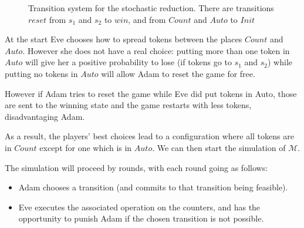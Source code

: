 \documentclass{article}
\begin{document}
	\begin{figure}[h]
		\caption{Transition system for the stochastic reduction. There are transitions $reset$ from $s_1$ and $s_2$ to $win$, and from $Count$ and $Auto$ to $Init$}
		\label{fig-sreach1}
	\end{figure}
	
	At the start Eve chooses how to spread tokens between the places $Count$ and $Auto$. 
	However she does not have a real choice: putting more than one token in $Auto$ will give her a positive probability to lose (if tokens go to $s_1$ and $s_2$) while putting no tokens in $Auto$ will allow Adam to reset the game for free.
	
	However if Adam tries to reset the game while Eve did put tokens in Auto, those are sent to the winning state and the game restarts with less tokens, disadvantaging Adam. 
	
	As a result, the players' best choices lead to a configuration where all tokens are in $Count$ except for one which is in $Auto$. We can then start the simulation of $\mathcal{M}$.
	
	The simulation will proceed by rounds, with each round going as follows:
	\begin{itemize}
		\item Adam chooses a transition (and commits to that transition being feasible).
		
		\item Eve executes the associated operation on the counters, and has the opportunity to punish Adam if the chosen transition is not possible.  
	\end{itemize}
	
\end{document}
